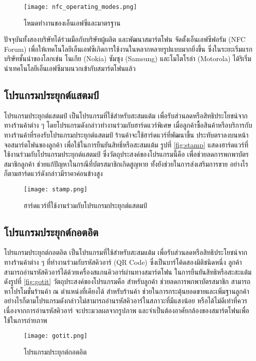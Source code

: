 \documentclass[12pt,a4paper]{article}
\begin{document}
\begin{figure}[ht!]
\centering
\texttt{[image: nfc\_operating\_modes.png]}
\caption{โหมดทำงานของเอ็นเอฟซีและมาตรฐาน} \label{fig:nfc}
\label{overflow}
\end{figure}

ปัจจุบันทั้งสองบริษัทได้ร่วมมือกับบริษัทผู้ผลิต และพัฒนาสมาร์ตโฟน จัดตั้งเอ็นเอฟซีฟอรัม (NFC Forum) เพื่อให้เทคโนโลยีเอ็นเอฟซีเกิดการใช้งานในหลากหลายรูปแบบมากยิ่งขึ้น ซึ่งในระยะเริ่มแรกบริษัทชั้นนำของโลกเช่น โนเกีย (Nokia) ซัมซุง (Samsung) และโมโตโรล่า (Motorola) ได้ริเริ่มนำเทคโนโลยีเอ็นเอฟซีมาผนวกเข้ากับสมาร์ตโฟนแล้ว

\subsection{โปรแกรมประยุกต์แสตมป์}
โปรแกรมประยุกต์แสตมป์ เป็นโปรแกรมที่ใช้สำหรับสะสมแต้ม เพื่อรับส่วนลดหรือสิทธิประโยชน์จากทางร้านค้าต่าง ๆ โดยโปรแกรมดังกล่าวทำงานร่วมกับฮาร์ดแวร์พิเศษ เมื่อลูกค้าซื้อสินค้าหรือบริการกับทางร้านค้าที่รองรับโปรแกรมประยุกต์แสตมป์ ร้านค้าจะใช้ฮาร์ดแวร์ที่พัฒนาขึ้น ประทับตราลงบนหน้าจอสมาร์ตโฟนของลูกค้า เพื่อใช้ในการยืนยันสิทธิ์หรือสะสมแต้ม รูปที่ \ref{fig:stamp} แสดงฮาร์ดแวร์ที่ใช้งานร่วมกับโปรแกรมประยุกต์แสตมป์ ซึ่งวัตถุประสงค์ของโปรแกรมนี้คือ เพื่อช่วยลดการพกพาบัตรสมาชิกลูกค้า ช่วยแก้ปัญหาในกรณีที่บัตรสมาชิกเกิดสูญหาย ทั้งยังช่วยในการส่งเสริมการขาย อย่างไรก็ตามฮาร์ดแวร์ดังกล่าวมีราคาค่อนข้างสูง
\begin{figure}[ht!]
\centering
\texttt{[image: stamp.png]}
\caption{ฮาร์ดแวร์ที่ใช้งานร่วมกับโปรแกรมประยุกต์แสตมป์ \cite{itm:stamp}} \label{fig:stamp}
\label{overflow}
\end{figure}

\subsection{โปรแกรมประยุกต์กอตอิต}
โปรแกรมประยุกต์กอตอิต เป็นโปรแกรมที่ใช้สำหรับสะสมแต้ม เพื่อรับส่วนลดหรือสิทธิประโยชน์จากทางร้านค้าต่าง ๆ ที่ทำงานร่วมกับรหัสคิวอาร์ (QR Code) ซึ่งเป็นบาร์โค้ดสองมิติชนิดหนึ่ง ลูกค้าสามารถอ่านรหัสคิวอาร์ได้ด้วยเครื่องสแกนคิวอาร์ผ่านทางสมาร์ตโฟน ในการยืนยันสิทธิหรือสะสะแต้ม ดังรูปที่ \ref{fig:gotit} วัตถุประสงค์ของโปรแกรมคือ สำหรับลูกค้า ช่วยลดการพกพาบัตรสมาชิก สามารถหาโปรโมชั่นร้านค้า ณ ตำแหน่งที่เคียงได้ สำหรับร้านค้า ช่วยในการกระตุ้นยอดขายและเพิ่มฐานลูกค้า อย่างไรก็ตามโปรแกรมดังกล่าวไม่สามารถอ่านรหัสคิวอาร์ในสภาวะที่มีแสงน้อย หรือได้ไม่ดีเท่าที่ควร เนื่องจากการอ่านรหัสคิวอาร์ จะประมวลผลจากรูปภาพ และจำเป็นต้องอาศัยกล้องของสมาร์ตโฟนเพื่อใช้ในการถ่ายภาพ
\begin{figure}[ht!]
\centering
\texttt{[image: gotit.png]}
\caption{โปรแกรมประยุกต์กอตอิต \cite{itm:gotit}} \label{fig:gotit}
\label{overflow}
\end{figure}
\end{document}
